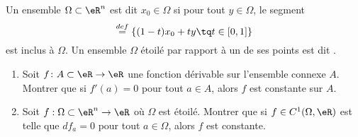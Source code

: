 
\begin{exercice}\label{exoTP20090001}

Un ensemble $\Omega\subset\eR^n$ est dit  $x_0\in\Omega$ si pour tout $y \in \Omega$, le segment
\begin{equation*}
	[x_0, y] \stackrel{def}{=} \{ (1-t) x_0 + t y \tq t \in  [0,1] \}
\end{equation*}
est inclus à $\Omega$. Un ensemble $\Omega$ étoilé par rapport à un de ses points est dit .

\begin{enumerate}
\item
Soit $f\colon A\subset \eR\to\eR$ une fonction dérivable sur l'ensemble connexe $A$. Montrer que si $f'(a)=0$ pour tout $a\in A$, alors $f$ est constante sur $A$.

\item
Soit $f : \Omega \subset \eR^n \to \eR$ où $\Omega$ est étoilé. Montrer que si $f \in C^1(\Omega,{\eR})$ est telle que $df_a = 0$ pour tout $a \in \Omega$, alors $f$ est constante.

\end{enumerate}

\end{exercice}
